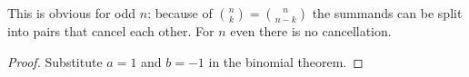 

\setcounter{section}{3}
\setcounter{subsection}{4}
\setcounter{dfn}{8}

This is obvious for odd $n$: because of $\binom{n}{k} = \binom{n}{n-k}$ the summands can be split into pairs that cancel each other.
For $n$ even there is no cancellation.
\begin{proof}
Substitute $a=1$ and $b=-1$ in the binomial theorem.
\end{proof}





